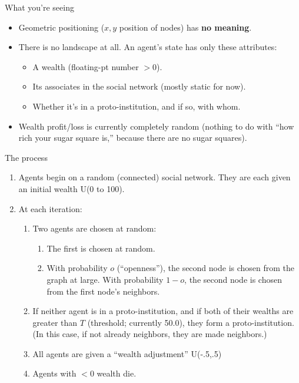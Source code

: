 \documentclass[12pt,handout]{beamer}
\author{Stephen Davies}
\newcommand{\freakingtilde}{\raisebox{0.5ex}{\texttildelow}}
\begin{document}
\begin{frame}[c]{What you're seeing}

\begin{itemize}
\pause
\item Geometric positioning ($x,y$ position of nodes) has \textbf{no meaning}.
\pause
\item There is no landscape at all. An agent's state has only these attributes:
    \begin{itemize}
    \item A wealth (floating-pt number $> 0$).
    \item Its associates in the social network (mostly static for now).
    \item Whether it's in a proto-institution, and if so, with whom.
    \end{itemize}

\pause
\item Wealth profit/loss is currently completely random (nothing to do with
``how rich your sugar square is,'' because there are no sugar squares).
\end{itemize}

\end{frame}

\begin{frame}[c]{The process}

\begin{enumerate}
\small
\item Agents begin on a random (connected) social network. They are each given
an initial wealth \freakingtilde U(0 to 100).

\pause
\item At each iteration:

    \begin{enumerate}
    \item Two agents are chosen at random:

        \begin{enumerate}
        \item The first is chosen at random.
        \item With probability $o$ (``openness''), the second node is chosen
from the graph at large. With probability $1-o$, the second node is chosen from
the first node's neighbors.
        \end{enumerate}

\pause
    \item If neither agent is in a proto-institution, and if both of their
wealths are greater than $T$ (threshold; currently 50.0), they form a
proto-institution. (In this case, if not already neighbors, they are made
neighbors.)

\pause
    \item All agents are given a ``wealth adjustment'' \freakingtilde
U(-.5,.5)

\pause
    \item Agents with $< 0$ wealth die.
    \end{enumerate}

\end{enumerate}

\end{frame}
\end{document}
